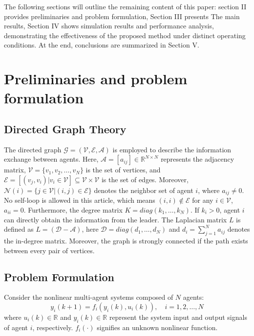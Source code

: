 \documentclass[journal,onecolumn]{IEEEtran}
\begin{document}
    The following sections will outline the remaining content of this paper:
    section II provides preliminaries and problem formulation, Section III presents The main results, Section IV shows simulation results and performance analysis, demonstrating the effectiveness of the proposed method under distinct operating conditions. At the end, conclusions are summarized in Section V.


\section{Preliminaries and problem formulation}\label{section:2}
\subsection{Directed Graph Theory}

\indent The directed graph $ \mathcal{G} = (\mathcal{V}, \mathcal{E}, \mathcal{A}) $ is employed to describe the information exchange between agents. Here, $ \mathcal{A} = [a_{ij}] \in \mathbb{R}^{N \times N} $ represents the adjacency matrix, $ \mathcal{V}=\{v_1, v_2,\dots,v_N\} $ is the set of vertices, and $ \mathcal{E} = [(v_j,v_i)|v_i \in \mathcal{V} ] \subseteq \mathcal{V} \times \mathcal{V}$ is the set of edges. Moreover, $ \mathcal{N}(i) = \{j \in \mathcal{V} |(i,j) \in \mathcal{E}\} $ denotes the neighbor set of agent $ i $, where $ a_{i j} \neq 0$. No self-loop is allowed in this article, which means $(i, i) \notin \mathcal{E}$ for any $ i \in \mathcal{V} $, $ a_{ii}=0$. Furthermore, the degree matrix $ K = diag(k_1,\dots,k_N)$. If $ k_i > 0$, agent $ i $ can directly obtain the information from the leader. The Laplacian matrix $ L $ is defined as $ L = (\mathcal{D}-\mathcal{A})$, here $\mathcal{D} = diag({d_1,\dots,d_N})$ and $d_i=\sum_{j=1}^{N} a_{i j}$ denotes the in-degree matrix. Moreover, the graph is strongly connected if the path exists between every pair of vertices.

\subsection{Problem Formulation}

Consider the nonlinear multi-agent systems composed of $ N $ agents:
\begin{equation}
    \label{model 1}
    y_i(k+1) = f_i(y_i(k), u_i(k)), \quad i = 1, 2, \dots, N
\end{equation}
where $u_i(k) \in \mathbb{R}$ and $y_i(k) \in \mathbb{R}$ represent the system input and output signals of agent $ i $, respectively. $f_i(\cdot)$ signifies an unknown nonlinear function.
\end{document}
